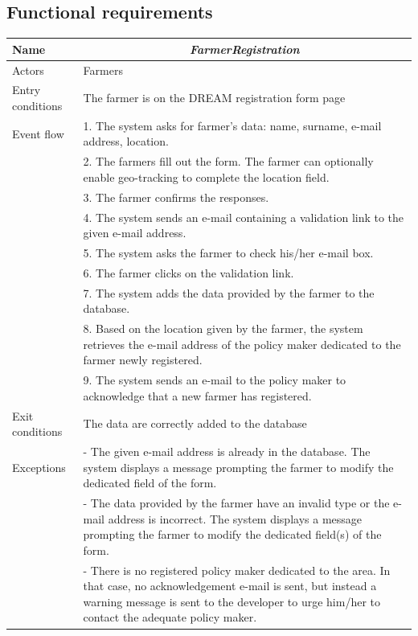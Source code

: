\subsection{Functional requirements}
\begin{table}[htbp]
	\centering
	\begin{tabularx}{\linewidth}{|l|X|}
		\hline
		Name & \multicolumn{1}{c|}{\textit{\textbf{FarmerRegistration}}}                                                   \tabularnewline \hline
		Actors                                               & Farmers                                                    \tabularnewline \hline
		Entry conditions                                              & The farmer is on the DREAM registration form page                                                                                  \tabularnewline \hline
		Event flow                                         & 1.	The system asks for farmer’s data: name, surname, e-mail address, location.                                                                    \tabularnewline 
		& 2.	The farmers fill out the form. The farmer can optionally enable geo-tracking to complete the location field.                                                   \tabularnewline 
		& 3.	The farmer confirms the responses.                                                   \tabularnewline 
		& 4.	The system sends an e-mail containing a validation link to the given e-mail address.                                                \tabularnewline
		& 5.	The system asks the farmer to check his/her e-mail box.                                               \tabularnewline
		& 6.	The farmer clicks on the validation link.                                     \tabularnewline
		& 7.	The system adds the data provided by the farmer to the database.                                  \tabularnewline
		& 8.	Based on the location given by the farmer, the system retrieves the e-mail address of the policy maker dedicated to the farmer newly registered.                               \tabularnewline
		& 9.	The system sends an e-mail to the policy maker to acknowledge that a new farmer has registered.                              \tabularnewline \hline
		Exit conditions & The data are correctly added to the database
		\tabularnewline \hline
		Exceptions & 
		-	The given e-mail address is already in the database. The system displays a message prompting the farmer to modify the dedicated field of the form.  \tabularnewline
		
		&-	The data provided by the farmer have an invalid type or the e-mail address is incorrect. The system displays a message prompting the farmer to modify the dedicated field(s) of the form. 
		\tabularnewline
		&-	There is no registered policy maker dedicated to the area. In that case, no acknowledgement e-mail is sent, but instead a warning message is sent to the developer to urge him/her to contact the adequate policy maker. 
		\tabularnewline
		\hline
	\end{tabularx}   
\end{table}


